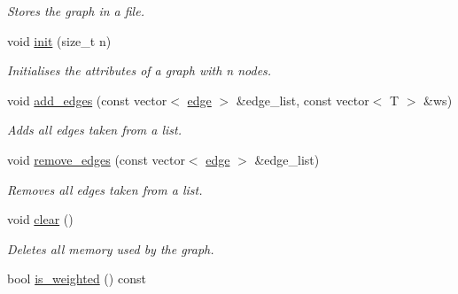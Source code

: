 \begin{DoxyCompactItemize}
\begin{DoxyCompactList}\small\item\em Stores the graph in a file. \end{DoxyCompactList}\item 
void \hyperlink{classlgraph_1_1utils_1_1wxgraph_a566ae9fe69209230ef159ed350ab8f7f}{init} (size\+\_\+t n)
\begin{DoxyCompactList}\small\item\em Initialises the attributes of a graph with {\itshape n} nodes. \end{DoxyCompactList}\item 
void \hyperlink{classlgraph_1_1utils_1_1wxgraph_a972a2483966f4b1d485c5d14157ee9be}{add\+\_\+edges} (const vector$<$ \hyperlink{namespacelgraph_1_1utils_a6510284ce1b1ae5dc97ce5d2de426e10}{edge} $>$ \&edge\+\_\+list, const vector$<$ T $>$ \&ws)
\begin{DoxyCompactList}\small\item\em Adds all edges taken from a list. \end{DoxyCompactList}\item 
void \hyperlink{classlgraph_1_1utils_1_1wxgraph_a4188b82f50e962b28c2c076b7978a854}{remove\+\_\+edges} (const vector$<$ \hyperlink{namespacelgraph_1_1utils_a6510284ce1b1ae5dc97ce5d2de426e10}{edge} $>$ \&edge\+\_\+list)
\begin{DoxyCompactList}\small\item\em Removes all edges taken from a list. \end{DoxyCompactList}\item 
void \hyperlink{classlgraph_1_1utils_1_1wxgraph_a421bc8166e35335445e45efc680ebe3f}{clear} ()
\begin{DoxyCompactList}\small\item\em Deletes all memory used by the graph. \end{DoxyCompactList}\item 
bool \hyperlink{classlgraph_1_1utils_1_1wxgraph_adda596cfbf72080d46ab445679fe092f}{is\+\_\+weighted} () const \hypertarget{classlgraph_1_1utils_1_1wxgraph_adda596cfbf72080d46ab445679fe092f}{}\label{classlgraph_1_1utils_1_1wxgraph_adda596cfbf72080d46ab445679fe092f}


\end{DoxyCompactItemize}
